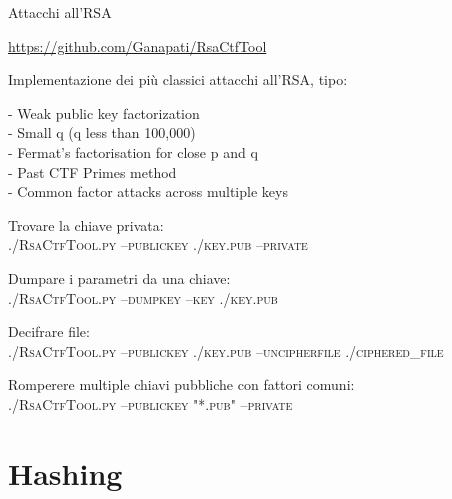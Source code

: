 \documentclass[handout, xcolor=dvipsnames,aspectratio=169]{beamer}
\begin{document}
\begin{frame}{Attacchi all'RSA}

\url{https://github.com/Ganapati/RsaCtfTool}
 
Implementazione dei più classici attacchi all'RSA, tipo:

\small

\medskip

- Weak public key factorization\\
- Small q (q less than 100,000)\\
- Fermat's factorisation for close p and q\\
- Past CTF Primes method\\
- Common factor attacks across multiple keys\\

\medskip

Trovare la chiave privata:\\
\phantom{    } \textsc{./RsaCtfTool.py --publickey ./key.pub --private}

Dumpare i parametri da una chiave:\\
\phantom{    } \textsc{./RsaCtfTool.py --dumpkey --key ./key.pub}

Decifrare file:\\
\phantom{    } \textsc{./RsaCtfTool.py --publickey ./key.pub --uncipherfile ./ciphered\_file}

Romperere multiple chiavi pubbliche con fattori comuni:\\
\phantom{    } \textsc{./RsaCtfTool.py --publickey "*.pub" --private}


\end{frame}


\part{Hashing}

\begin{frame}
	\partpage
	\centering
\end{frame}
\end{document}
